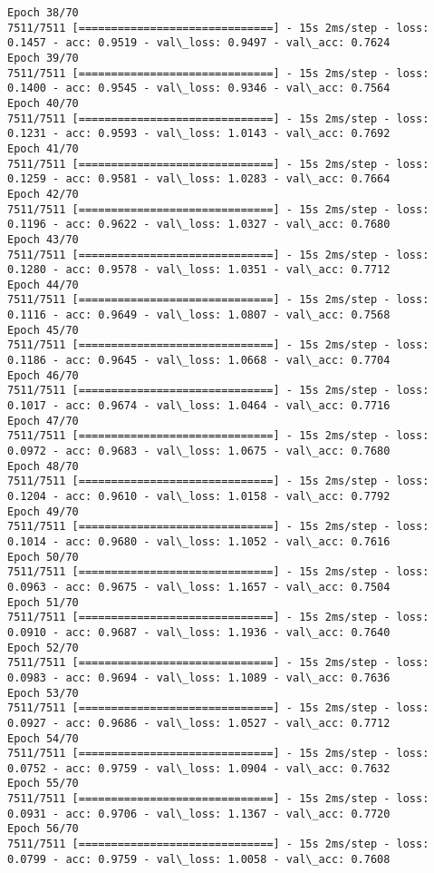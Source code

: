 \documentclass[11pt]{article}
\begin{document}
\begin{Verbatim}[commandchars=\\\{\}]
Epoch 38/70
7511/7511 [==============================] - 15s 2ms/step - loss: 0.1457 - acc: 0.9519 - val\_loss: 0.9497 - val\_acc: 0.7624
Epoch 39/70
7511/7511 [==============================] - 15s 2ms/step - loss: 0.1400 - acc: 0.9545 - val\_loss: 0.9346 - val\_acc: 0.7564
Epoch 40/70
7511/7511 [==============================] - 15s 2ms/step - loss: 0.1231 - acc: 0.9593 - val\_loss: 1.0143 - val\_acc: 0.7692
Epoch 41/70
7511/7511 [==============================] - 15s 2ms/step - loss: 0.1259 - acc: 0.9581 - val\_loss: 1.0283 - val\_acc: 0.7664
Epoch 42/70
7511/7511 [==============================] - 15s 2ms/step - loss: 0.1196 - acc: 0.9622 - val\_loss: 1.0327 - val\_acc: 0.7680
Epoch 43/70
7511/7511 [==============================] - 15s 2ms/step - loss: 0.1280 - acc: 0.9578 - val\_loss: 1.0351 - val\_acc: 0.7712
Epoch 44/70
7511/7511 [==============================] - 15s 2ms/step - loss: 0.1116 - acc: 0.9649 - val\_loss: 1.0807 - val\_acc: 0.7568
Epoch 45/70
7511/7511 [==============================] - 15s 2ms/step - loss: 0.1186 - acc: 0.9645 - val\_loss: 1.0668 - val\_acc: 0.7704
Epoch 46/70
7511/7511 [==============================] - 15s 2ms/step - loss: 0.1017 - acc: 0.9674 - val\_loss: 1.0464 - val\_acc: 0.7716
Epoch 47/70
7511/7511 [==============================] - 15s 2ms/step - loss: 0.0972 - acc: 0.9683 - val\_loss: 1.0675 - val\_acc: 0.7680
Epoch 48/70
7511/7511 [==============================] - 15s 2ms/step - loss: 0.1204 - acc: 0.9610 - val\_loss: 1.0158 - val\_acc: 0.7792
Epoch 49/70
7511/7511 [==============================] - 15s 2ms/step - loss: 0.1014 - acc: 0.9680 - val\_loss: 1.1052 - val\_acc: 0.7616
Epoch 50/70
7511/7511 [==============================] - 15s 2ms/step - loss: 0.0963 - acc: 0.9675 - val\_loss: 1.1657 - val\_acc: 0.7504
Epoch 51/70
7511/7511 [==============================] - 15s 2ms/step - loss: 0.0910 - acc: 0.9687 - val\_loss: 1.1936 - val\_acc: 0.7640
Epoch 52/70
7511/7511 [==============================] - 15s 2ms/step - loss: 0.0983 - acc: 0.9694 - val\_loss: 1.1089 - val\_acc: 0.7636
Epoch 53/70
7511/7511 [==============================] - 15s 2ms/step - loss: 0.0927 - acc: 0.9686 - val\_loss: 1.0527 - val\_acc: 0.7712
Epoch 54/70
7511/7511 [==============================] - 15s 2ms/step - loss: 0.0752 - acc: 0.9759 - val\_loss: 1.0904 - val\_acc: 0.7632
Epoch 55/70
7511/7511 [==============================] - 15s 2ms/step - loss: 0.0931 - acc: 0.9706 - val\_loss: 1.1367 - val\_acc: 0.7720
Epoch 56/70
7511/7511 [==============================] - 15s 2ms/step - loss: 0.0799 - acc: 0.9759 - val\_loss: 1.0058 - val\_acc: 0.7608

\end{Verbatim}
\end{document}
